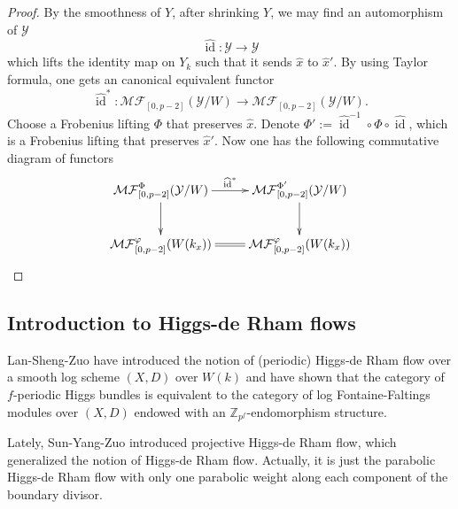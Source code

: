 \documentclass[12pt,twoside]{book}
\theoremstyle{plain}
\theoremstyle{definition}
\theoremstyle{remark}
\newcommand{\bZ}{{\mathbb Z}}
\newcommand{\mY}{{\mathcal Y}}
\DeclareMathOperator\id{id}
\newcommand{\MF}{\mathcal{MF}}
\numberwithin{equation}{section}
\begin{document}
\begin{proof}
By the smoothness of $Y$, after shrinking $Y$, we may find an automorphism of $\mY$
\[\widehat{\id} \colon \mY \rightarrow \mY\]
which lifts the identity map on $Y_k$ such that it sends $\widehat{x}$ to $\widehat{x}'$. By using Taylor formula, one gets an canonical equivalent functor
\[\widehat{\id}^*\colon \MF_{[0,p-2]}(\mY/W) \rightarrow \MF_{[0,p-2]}(\mY/W).\]
Choose a Frobenius lifting $\Phi$ that preserves $\widehat{x}$. Denote $\Phi':= \widehat{\id}^{-1} \circ \Phi \circ \widehat{\id}$, which is a Frobenius lifting that preserves $\widehat{x}'$. Now one has the following commutative diagram of functors
\begin{equation*}
\xymatrix{
\MF^{\Phi}_{[0,p-2]}(\mY/W) \ar[r]^{\widehat{\id}^*} \ar[d] & \MF^{\Phi'}_{[0,p-2]}(\mY/W)\ar[d]
\\
\MF^{\varphi}_{[0,p-2]}(W(k_x)) \ar@{=}[r] & \MF^{\varphi}_{[0,p-2]}(W(k_x))
\\
}
\end{equation*}
\end{proof}

\newpage

\subsection{Introduction to Higgs-de Rham flows}

Lan-Sheng-Zuo have introduced the notion of (periodic) Higgs-de Rham flow over a smooth log scheme $(X,D)$ over $W(k)$ and have shown that the category of $f$-periodic Higgs bundles is equivalent to the category of log Fontaine-Faltings modules over $(X,D)$ endowed with an $\bZ_{p^f}$-endomorphism structure.

Lately, Sun-Yang-Zuo introduced projective Higgs-de Rham flow, which generalized the notion of Higgs-de Rham flow. Actually, it is just the parabolic Higgs-de Rham flow with only one parabolic weight along each component of the boundary divisor.
\end{document}
